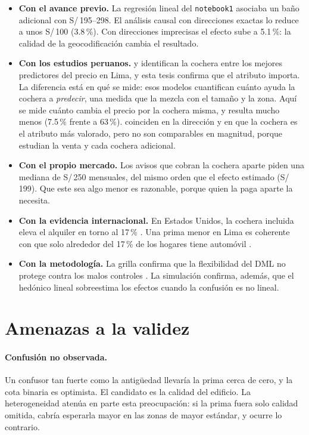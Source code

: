 \begin{itemize}[leftmargin=*]
\item \textbf{Con el avance previo.} La regresión lineal del \texttt{notebook1} asociaba un baño adicional con S/\,195--298. El análisis causal con direcciones exactas lo reduce a unos S/\,100 (3.8\,\%). Con direcciones imprecisas el efecto sube a 5.1\,\%: la calidad de la geocodificación cambia el resultado.
\item \textbf{Con los estudios peruanos.} \citet{cacnahuaray2024} y \citet{barrientos2026} identifican la cochera entre los mejores predictores del precio en Lima, y esta tesis confirma que el atributo importa. La diferencia está en qué se mide: esos modelos cuantifican cuánto ayuda la cochera a \emph{predecir}, una medida que la mezcla con el tamaño y la zona. Aquí se mide cuánto cambia el precio por la cochera misma, y resulta mucho menos (7.5\,\% frente a 63\,\%). \citet{mundaca2018} coinciden en la dirección y en que la cochera es el atributo más valorado, pero no son comparables en magnitud, porque estudian la venta y cada cochera adicional.
\item \textbf{Con el propio mercado.} Los avisos que cobran la cochera aparte piden una mediana de S/\,250 mensuales, del mismo orden que el efecto estimado (S/\,199). Que este sea algo menor es razonable, porque quien la paga aparte la necesita.
\item \textbf{Con la evidencia internacional.} En Estados Unidos, la cochera incluida eleva el alquiler en torno al 17\,\% \citep{gabbe2017}. Una prima menor en Lima es coherente con que solo alrededor del 17\,\% de los hogares tiene automóvil \citep{limacomovamos2016}.
\item \textbf{Con la metodología.} La grilla confirma que la flexibilidad del DML no protege contra los malos controles \citep{hunermund2023}. La simulación confirma, además, que el hedónico lineal sobreestima los efectos cuando la confusión es no lineal.
\end{itemize}

\section{Amenazas a la validez}

\paragraph{Confusión no observada.} Un confusor tan fuerte como la antigüedad llevaría la prima cerca de cero, y la cota binaria es optimista. El candidato es la calidad del edificio. La heterogeneidad atenúa en parte esta preocupación: si la prima fuera solo calidad omitida, cabría esperarla mayor en las zonas de mayor estándar, y ocurre lo contrario.


